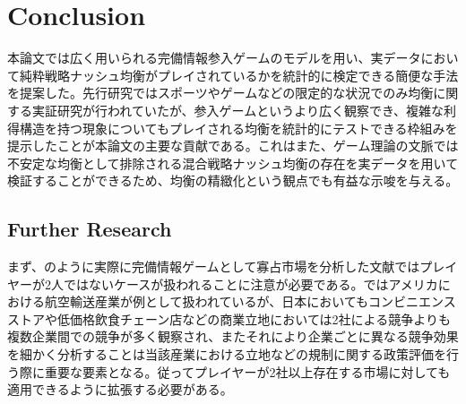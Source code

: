 \documentclass{jsarticle}
\begin{document}

\section{Conclusion}
本論文では広く用いられる完備情報参入ゲームのモデルを用い、実データにおいて純粋戦略ナッシュ均衡がプレイされているかを統計的に検定できる簡便な手法を提案した。先行研究ではスポーツやゲームなどの限定的な状況でのみ均衡に関する実証研究が行われていたが、参入ゲームというより広く観察でき、複雑な利得構造を持つ現象についてもプレイされる均衡を統計的にテストできる枠組みを提示したことが本論文の主要な貢献である。これはまた、ゲーム理論の文脈では不安定な均衡として排除される混合戦略ナッシュ均衡の存在を実データを用いて検証することができるため、均衡の精緻化という観点でも有益な示唆を与える。

\subsection{Further Research}
まず、\cite{Ciliberto2009a}のように実際に完備情報ゲームとして寡占市場を分析した文献ではプレイヤーが2人ではないケースが扱われることに注意が必要である。\cite{Ciliberto2009a}ではアメリカにおける航空輸送産業が例として扱われているが、日本においてもコンビニエンスストアや低価格飲食チェーン店などの商業立地においては2社による競争よりも複数企業間での競争が多く観察され、またそれにより企業ごとに異なる競争効果を細かく分析することは当該産業における立地などの規制に関する政策評価を行う際に重要な要素となる。従ってプレイヤーが2社以上存在する市場に対しても適用できるように拡張する必要がある。
\end{document}
